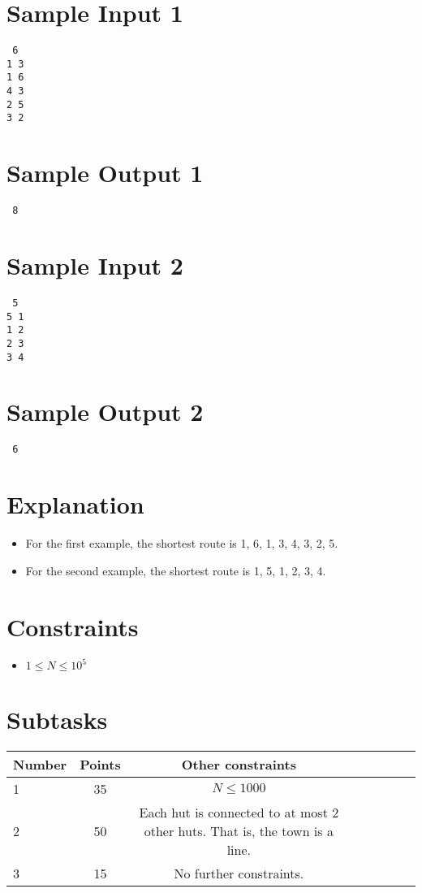 \documentclass{article}
\begin{document}
\begin{multicols}{2}
\section*{Sample Input 1}
{\tt
6\\
1 3\\
1 6\\
4 3\\
2 5\\
3 2}
\columnbreak
\section*{Sample Output 1}
{\tt
8
}
\end{multicols}
\newpage
\begin{multicols}{2}
\section*{Sample Input 2}
{\tt
5\\
5 1\\
1 2\\
2 3\\
3 4
}
\columnbreak
\section*{Sample Output 2}
{\tt
6
}
\end{multicols}

\section*{Explanation}
\begin{itemize}
\item For the first example, the shortest route is 1, 6, 1, 3, 4, 3, 2, 5.
\item For the second example, the shortest route is 1, 5, 1, 2, 3, 4.
\end{itemize}

\section*{Constraints}
\begin{itemize}
\item $1 \le N \le 10^5$
\end{itemize}

\section*{Subtasks}
\begin{tabular}{l*{6}{c}r}
Number & Points & Other constraints\\
\hline
1 & 35 & $N \le 1000$ \\
2 & 50 & Each hut is connected to at most 2 other huts. That is, the town is a line. \\
3 & 15 & No further constraints.
\end{tabular}
\end{document}
